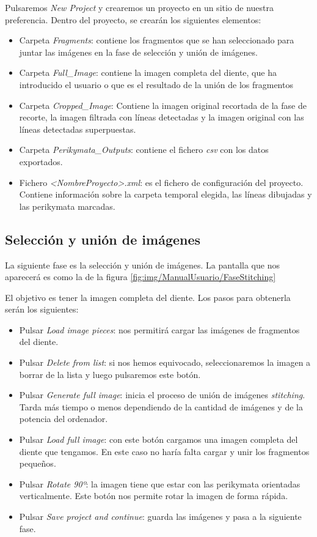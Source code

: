 Pulsaremos \textit{New Project} y crearemos un proyecto en un sitio de nuestra preferencia. Dentro del proyecto, se crearán los siguientes elementos:
\begin{itemize}
    \item Carpeta \textit{Fragments}: contiene los fragmentos que se han seleccionado para juntar las imágenes en la fase de selección y unión de imágenes.
    \item Carpeta \textit{Full\_Image}: contiene la imagen completa del diente, que ha introducido el usuario o que es el resultado de la unión de los fragmentos
    \item Carpeta \textit{Cropped\_Image}: Contiene la imagen original recortada de la fase de recorte, la imagen filtrada con líneas detectadas y la imagen original con las líneas detectadas superpuestas.
    \item Carpeta \textit{Perikymata\_Outputs}: contiene el fichero \textit{csv} con los datos exportados.
    \item Fichero \textit{\textit{<NombreProyecto>.xml}}: es el fichero de configuración del proyecto. Contiene información sobre la carpeta temporal elegida, las líneas dibujadas y las perikymata marcadas.
\end{itemize}

\subsection{Selección y unión de imágenes}

La siguiente fase es la selección y unión de imágenes. La pantalla que nos aparecerá es como la de la figura \ref{fig:img/ManualUsuario/FaseStitching}


El objetivo es tener la imagen completa del diente. Los pasos para obtenerla serán los siguientes:
\begin{itemize}
    \item Pulsar \textit{Load image pieces}: nos permitirá cargar las imágenes de fragmentos del diente.
    \item Pulsar \textit{Delete from list}: si nos hemos equivocado, seleccionaremos la imagen a borrar de la lista y luego pulsaremos este botón.
    \item Pulsar \textit{Generate full image}: inicia el proceso de unión de imágenes \textit{stitching}. Tarda más tiempo o menos dependiendo de la cantidad de imágenes y de la potencia del ordenador.
    \item Pulsar \textit{Load full image}: con este botón cargamos una imagen completa del diente que tengamos. En este caso no haría falta cargar y unir los fragmentos pequeños.
    \item Pulsar \textit{Rotate 90º}: la imagen tiene que estar con las perikymata orientadas verticalmente. Este botón nos permite rotar la imagen de forma rápida.
    \item Pulsar \textit{Save project and continue}: guarda las imágenes y pasa a la siguiente fase.
\end{itemize}

